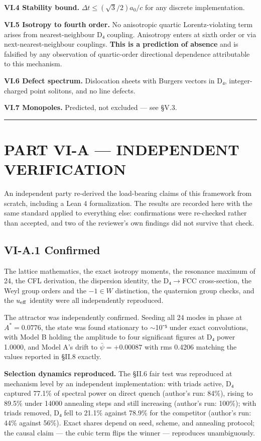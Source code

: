 \documentclass[a4paper,11pt]{article}
\begin{document}
\textbf{VI.4 Stability bound.} $\Delta t\le(\sqrt3/2)a_0/c$ for any discrete implementation.

\textbf{VI.5 Isotropy to fourth order.} No anisotropic quartic Lorentz-violating term arises from nearest-neighbour D₄ coupling. Anisotropy enters at sixth order or via next-nearest-neighbour couplings. \textbf{This is a prediction of absence} and is falsified by any observation of quartic-order directional dependence attributable to this mechanism.

\textbf{VI.6 Defect spectrum.} Dislocation sheets with Burgers vectors in D₄, integer-charged point solitons, and no line defects.

\textbf{VI.7 Monopoles.} Predicted, not excluded — see §V.3.

\medskip\hrule\medskip

\section*{PART VI-A — INDEPENDENT VERIFICATION}

An independent party re-derived the load-bearing claims of this framework from scratch, including a Lean 4 formalization. The results are recorded here with the same standard applied to everything else: confirmations were re-checked rather than accepted, and two of the reviewer's own findings did not survive that check.

\subsection*{VI-A.1 Confirmed}

The lattice mathematics, the exact isotropy moments, the resonance maximum of 24, the CFL derivation, the dispersion identity, the D₄$\to$FCC cross-section, the Weyl group orders and the $-1\in W$ distinction, the quaternion group checks, and the $u_{\rm eff}$ identity were all independently reproduced.

The attractor was independently confirmed. Seeding all 24 modes in phase at $A^* = 0.0776$, the state was found stationary to $\sim$10⁻⁵ under exact convolutions, with Model B holding the amplitude to four significant figures at D₄ power 1.0000, and Model A's drift to $\bar\psi = +0.00087$ with rms 0.4206 matching the values reported in §II.8 exactly.

\textbf{Selection dynamics reproduced.} The §II.6 fair test was reproduced at mechanism level by an independent implementation: with triads active, D₄ captured 77.1\% of spectral power on direct quench (author's run: 84\%), rising to 89.5\% under 14000 annealing steps and still increasing (author's run: 100\%); with triads removed, D₄ fell to 21.1\% against 78.9\% for the competitor (author's run: 44\% against 56\%). Exact shares depend on seed, scheme, and annealing protocol; the causal claim — the cubic term flips the winner — reproduces unambiguously.
\end{document}
